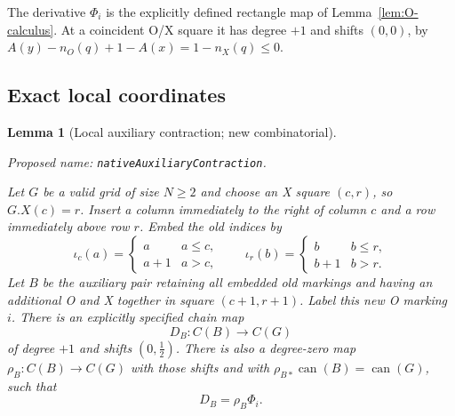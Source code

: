 \documentclass[11pt,a4paper]{article}
\newtheorem{lemma}[theorem]{Lemma}
\theoremstyle{remark}
\newcommand{\formalname}[1]{\leavevmode\par\noindent\textnormal{\small Proposed name: \texttt{#1}.}\par\smallskip}
\begin{document}
The derivative $\Phi_i$ is the explicitly defined rectangle map of
Lemma~\ref{lem:O-calculus}.  At a coincident O/X square it has
degree $+1$ and shifts $(0,0)$, by
$A(y)-n_O(q)+1-A(x)=1-n_X(q)\le0$.

\subsection{Exact local coordinates}

\begin{lemma}[Local auxiliary contraction; new combinatorial]\label{lem:aux-death}
\formalname{nativeAuxiliaryContraction}
Let $G$ be a valid grid of size $N\ge2$ and choose an X square
$(c,r)$, so $G.X(c)=r$.  Insert a column immediately to the right of
column $c$ and a row immediately above row $r$.  Embed the old indices by
\[
 \iota_c(a)=\begin{cases}a&a\le c,\\a+1&a>c,\end{cases}
 \qquad
 \iota_r(b)=\begin{cases}b&b\le r,\\b+1&b>r.\end{cases}
\]
Let $B$ be the auxiliary pair retaining all embedded old markings and
having an additional O and X together in square $(c+1,r+1)$.  Label this
new O marking $i$.  There is an explicitly specified chain map
\[
 D_B:C(B)\longrightarrow C(G)
\]
of degree $+1$ and shifts $(0,\tfrac12)$.  There is also a degree-zero
map $\rho_B:C(B)\to C(G)$ with those shifts and with
$\rho_{B*}\operatorname{can}(B)=\operatorname{can}(G)$, such that
\[
 D_B=\rho_B\Phi_i.
\]
\end{lemma}
\end{document}
